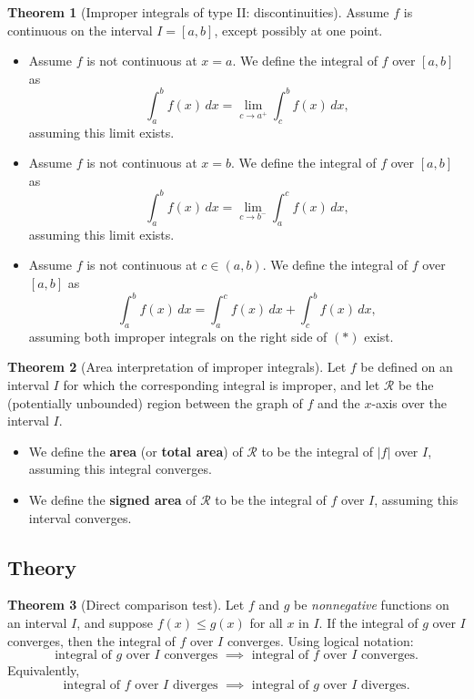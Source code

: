\documentclass[11pt]{article}
\theoremstyle{definition}
\theoremstyle{named}
\newtheorem*{namedtheorem}{Theorem}
\numberwithin{myalgctr}{section}
\begin{document}
\begin{samepage}
\begin{namedtheorem}[Improper integrals of type II: discontinuities] Assume $f$ is continuous on the interval $I=[a,b]$, except possibly at one point.
  \begin{itemize}
    \item Assume $f$ is not continuous at $x=a$. We define the integral of $f$ over $[a,b]$ as
    \[
    \int_a^bf(x)\, dx=\lim_{c\to a^+}\int_c^b f(x)\, dx,
    \]
    assuming this limit exists.
    \item Assume $f$ is not continuous at $x=b$. We define the integral of $f$ over $[a,b]$ as
    \[
    \int_a^bf(x)\, dx=\lim_{c\to b^-}\int_a^c f(x)\, dx,
    \]
    assuming this limit exists.
    \item Assume $f$ is not continuous at $c\in (a,b)$. We define the integral of $f$ over $[a,b]$ as
    \[
    \int_a^bf(x)\, dx=\int_a^c f(x)\, dx+ \int_c^b f(x)\, dx, \tag{$*$}
    \]
    assuming both improper integrals on the right side of $(*)$ exist.
  \end{itemize}

\end{namedtheorem}
\end{samepage}
\begin{namedtheorem}[Area interpretation of improper integrals] Let $f$ be defined on an interval $I$ for which the corresponding integral is improper, and let $\mathcal{R}$ be the (potentially unbounded) region between the graph of $f$ and the $x$-axis over the interval $I$.
  \begin{itemize}
  \item We define the {\bf area} (or {\bf total area}) of $\mathcal{R}$ to be the integral of $\lvert f\rvert$ over $I$, assuming this integral converges.
  \item We define the {\bf signed area} of $\mathcal{R}$ to be the integral of $f$ over $I$, assuming this interval converges.
\end{itemize}
\end{namedtheorem}

 \subsection*{Theory}
\begin{namedtheorem}[Direct comparison test] Let $f$ and $g$ be {\em nonnegative} functions on an interval $I$, and suppose $f(x)\leq g(x)$ for all $x$ in $I$. If the integral of $g$ over $I$ converges, then the integral of $f$ over $I$ converges. Using logical notation:
  \[
  \text{integral of $g$ over $I$ converges }\implies \text{ integral of $f$ over $I$ converges}.
  \]
  Equivalently,
  \[
  \text{integral of $f$ over $I$ diverges }\implies \text{ integral of $g$ over $I$ diverges}.
  \]
\end{namedtheorem}
\end{document}
